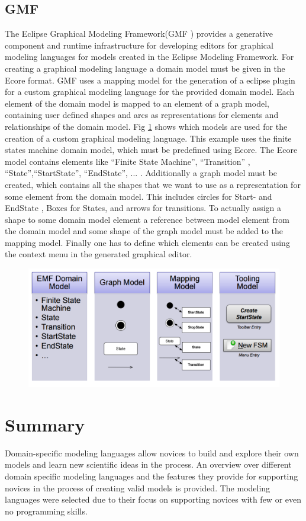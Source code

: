 \documentclass[runningheads,a4paper]{llncs}
\begin{document}
    \subsection{GMF}
    The Eclipse Graphical Modeling Framework(GMF \cite{gmf}) provides a generative component and runtime infrastructure for developing 
    editors for graphical modeling languages for models created in the Eclipse Modeling Framework.
    For creating a graphical modeling language a domain model must be given in the Ecore format.
    GMF uses a mapping model for the generation of a eclipse plugin for a custom graphical modeling language for the provided domain model. 
    Each element of the domain model is mapped to an element of a graph model, containing user defined shapes and arcs as representations for elements 
    and relationships of the domain model. Fig \ref{mapmodel} shows which models are used for the creation of a custom graphical modeling language.
    This example uses the finite states machine domain model, which must be predefined using Ecore. 
    The Ecore model contains elements like ``Finite State Machine'', ``Transition'' , ``State'',``StartState'', ``EndState'', ... .
    Additionally a graph model must be created, which contains all the shapes that we want to 
    use as a representation for some element from the domain model. This includes circles for Start- and EndState , Boxes for States,
    and arrows for transitions. To actually assign a shape to some domain model element a reference between model element from the domain model 
    and some shape of the graph model must be added to the mapping model. Finally one has to define which elements can be created using the context 
    menu in the generated graphical editor.
    \begin{figure}[H]
      \centering
      \includegraphics[width=.7\textwidth]{images/TableGMFSteps.PNG}
      \label{mapmodel}
    \end{figure}
    
\section{Summary}\label{sec:summary}
Domain-specific modeling languages allow novices to build and explore  their own models and learn new scientific ideas in the process.
An overview over different domain specific modeling languages and the features they provide for 
supporting novices in the process of creating valid models is provided.
The modeling languages were selected due to their focus on supporting novices with few or even no programming skills.
\end{document}
